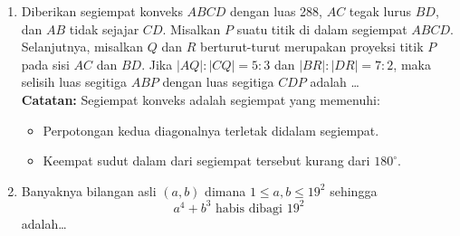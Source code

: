 \documentclass[12pt]{scrartcl}
\begin{document}
\begin{enumerate}
    \item Diberikan segiempat konveks $ABCD$ dengan luas 288, $AC$ tegak lurus $BD$, dan $AB$ tidak sejajar $CD$. Misalkan $P$ suatu titik di dalam segiempat $ABCD$. Selanjutnya, misalkan $Q$ dan $R$ berturut-turut merupakan proyeksi titik $P$ pada sisi $AC$ dan $BD$. Jika $|AQ|:|CQ|=5:3$ dan $|BR|:|DR|=7:2$, maka selisih luas segitiga $ABP$ dengan luas segitiga $CDP$ adalah \dots \\
    \textbf{Catatan:} Segiempat konveks adalah segiempat yang memenuhi:
    \begin{itemize}
        \item Perpotongan kedua diagonalnya terletak didalam segiempat.
        \item Keempat sudut dalam dari segiempat tersebut kurang dari $180^\circ$.
    \end{itemize}

    \item Banyaknya bilangan asli $(a,b)$ dimana $1 \le a,b \le 19^2$ sehingga $$a^4+b^3\text{ habis dibagi }19^2$$ adalah\dots
\end{enumerate}

\newpage
\end{document}
